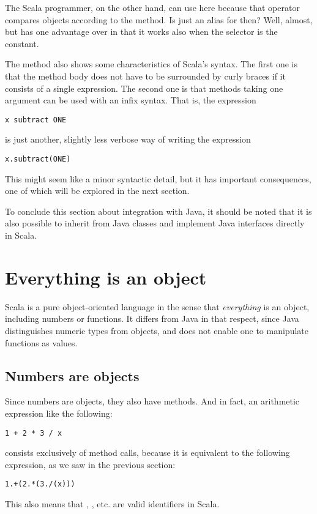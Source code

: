 \documentclass[a4paper,12pt,twoside,titlepage]{article}
\newcommand{\langname}[1]{#1\xspace}
\newcommand{\Scala}{\langname{Scala}}
\newcommand{\Java}{\langname{Java}}
\newcommand{\ident}[1]{\code{#1}\xspace}
\begin{document}
The \Scala programmer, on the other hand, can use \ident{==} here
because that operator compares objects according to the \ident{equals}
method. Is \ident{==} just an alias for \ident{equals} then? Well,
almost, but \ident{==} has one advantage over \ident{equals} in that
it works also when the selector is the \ident{null} constant.

The \ident{fact} method also shows some characteristics of \Scala's
syntax. The first one is that the method body does not have to be
surrounded by curly braces if it consists of a single expression.
The second one is that methods taking one argument can be used with an
infix syntax. That is, the expression
\begin{lstlisting}
x subtract ONE
\end{lstlisting}
is just another, slightly less verbose way of writing the expression
\begin{lstlisting}
x.subtract(ONE)
\end{lstlisting}
This might seem like a minor syntactic detail, but it has important
consequences, one of which will be explored in the next section.

To conclude this section about integration with \Java, it should be
noted that it is also possible to inherit from \Java classes and
implement \Java interfaces directly in \Scala.

\section{Everything is an object}
\label{sec:everything-an-object}

\Scala is a pure object-oriented language in the sense that
\emph{everything} is an object, including numbers or functions. It
differs from \Java in that respect, since \Java distinguishes numeric
types from objects, and does not enable one to manipulate functions as
values.

\subsection{Numbers are objects}
\label{sec:numbers-are-objects}

Since numbers are objects, they also have methods. And in fact, an
arithmetic expression like the following:
\begin{lstlisting}
1 + 2 * 3 / x
\end{lstlisting}
consists exclusively of method calls, because it is equivalent to the
following expression, as we saw in the previous section:
\begin{lstlisting}
1.+(2.*(3./(x)))
\end{lstlisting}
This also means that \ident{+}, \ident{*}, etc. are valid identifiers
in \Scala.
\end{document}
